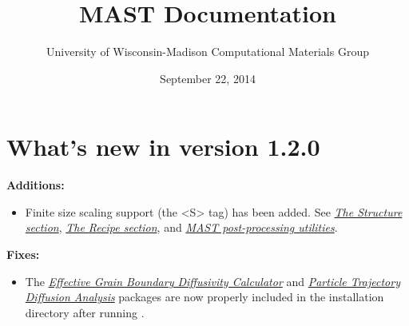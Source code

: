\documentclass[letterpaper,10pt,english]{sphinxmanual}
\title{MAST Documentation}
\date{September 22, 2014}
\author{University of Wisconsin-Madison Computational Materials Group}
\begin{document}
\maketitle
\tableofcontents
{}\label{index::doc}



\chapter{What's new in version 1.2.0}
\label{16_0_whatsnew::doc}\label{16_0_whatsnew:what-s-new-in-version-1-2-0}\label{16_0_whatsnew:materials-simulation-toolkit-mast-manual}
\textbf{Additions:}
\begin{itemize}
\item {} 
Finite size scaling support (the \textless{}S\textgreater{} tag) has been added. See {\hyperref[3_1_1_structure::doc]{\emph{The Structure section}}}, {\hyperref[3_1_3_recipe::doc]{\emph{The Recipe section}}}, and {\hyperref[6_0_postprocessingtools::doc]{\emph{MAST post-processing utilities}}}.

\end{itemize}

\textbf{Fixes:}
\begin{itemize}
\item {} 
The {\hyperref[8_0_2_gbdiff::doc]{\emph{Effective Grain Boundary Diffusivity Calculator}}} and {\hyperref[8_0_3_diffanalyzer::doc]{\emph{Particle Trajectory Diffusion Analysis}}} packages are now properly included in the installation directory after running .

\end{itemize}
\end{document}

